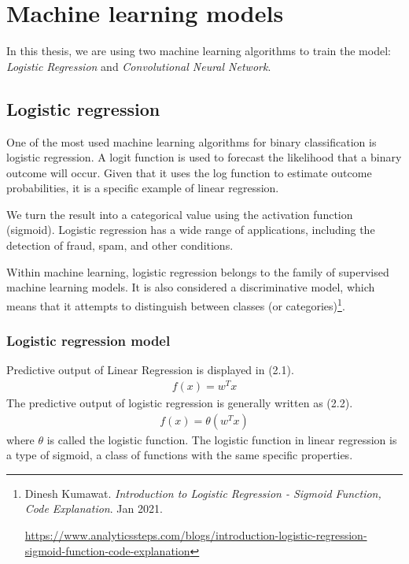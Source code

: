 \section{Machine learning models} 

\label{sec:machine_model}
\hspace{0.5cm}In this thesis, we are using two machine learning algorithms to train the model: \textit{Logistic Regression} and \textit{Convolutional Neural Network}.
\subsection{Logistic regression}
\label{subsec:logistic_regression}
\hspace{0.5cm}One of the most used machine learning algorithms for binary classification is logistic regression. A logit function is used to forecast the likelihood that a binary outcome will occur. Given that it uses the log function to estimate outcome probabilities, it is a specific example of linear regression.

We turn the result into a categorical value using the activation function (sigmoid). Logistic regression has a wide range of applications, including the detection of fraud, spam, and other conditions.

Within machine learning, logistic regression belongs to the family of supervised machine learning models. It is also considered a discriminative model, which means that it attempts to distinguish between classes (or categories)\footnote{Dinesh Kumawat. \textit{Introduction to Logistic Regression - Sigmoid Function, Code Explanation}. Jan 2021. \raggedright\url{https://www.analyticssteps.com/blogs/introduction-logistic-regression-sigmoid-function-code-explanation}}.
\subsubsection{Logistic regression model}
\hspace{0.5cm}Predictive output of Linear Regression is displayed in (2.1).
\begin{align}
	f(x) = w^T x
\end{align}
\hspace{0.5cm}The predictive output of logistic regression is generally written as (2.2).
\begin{align}
	f(x) = \theta(w^T x)
\end{align}
where $\theta$ is called the logistic function. The logistic function in linear regression is a type of sigmoid, a class of functions with the same specific properties.
